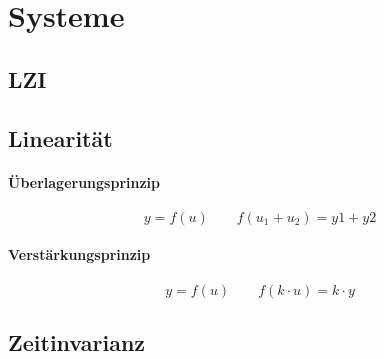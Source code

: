 



\chapter{Systeme}
\newpage

\section{LZI}

\section{Linearität}

\subsubsection{Überlagerungsprinzip}
\[
    y = f(u) \qquad f(u_1 + u_2) = y1 + y2
\]

\subsubsection{Verstärkungsprinzip}
\[
    y = f(u) \qquad f(k \cdot u) = k \cdot y
\]

\section{Zeitinvarianz}

